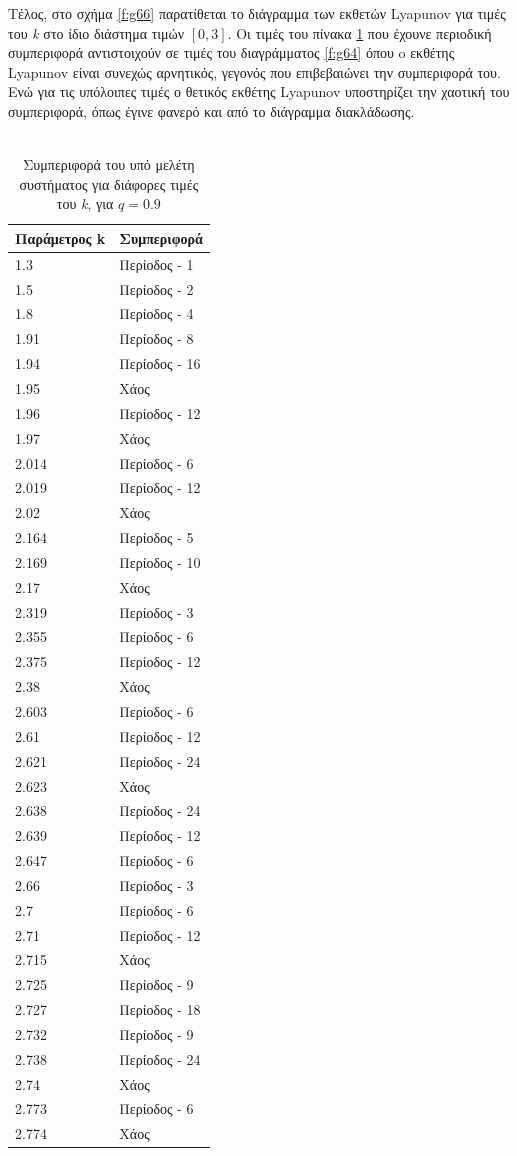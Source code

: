 Τέλος, στο σχήμα \ref{f:g66} παρατίθεται το διάγραμμα των εκθετών Lyapunov για τιμές του \emph{k} στο ίδιο διάστημα τιμών $[0, 3]$. Οι τιμές του πίνακα \ref{tab:abc13} που έχουνε περιοδική συμπεριφορά αντιστοιχούν σε τιμές του διαγράμματος \ref{f:g64} όπου o εκθέτης Lyapunov είναι συνεχώς αρνητικός, γεγονός που επιβεβαιώνει την συμπεριφορά του. Ενώ για τις υπόλοιπες τιμές ο θετικός εκθέτης Lyapunov υποστηρίζει την χαοτική του συμπεριφορά, όπως έγινε φανερό και από το διάγραμμα διακλάδωσης.\\\\

\begin{table}[ht]
	\centering
	\caption{ Συμπεριφορά του υπό μελέτη συστήματος για διάφορες τιμές του \emph{k}, για $q=0.9$ }
	\label{tab:abc13}
	\begin{tabular}{l | l}
		Παράμετρος k & Συμπεριφορά \\
		\hline
		1.3 &  Περίοδος -  1 \\
		1.5 &  Περίοδος -  2 \\
		1.8& Περίοδος -  4 \\
		1.91& Περίοδος -  8 \\
		1.94& Περίοδος -  16 \\
		1.95 & Xάος \\
		1.96& Περίοδος - 12 \\
		1.97& Xάος \\
		2.014& Περίοδος - 6 \\
		2.019& Περίοδος - 12\\
		2.02& Χάος \\
		2.164& Περίοδος - 5 \\
		2.169 &  Περίοδος - 10  \\
		2.17 &  Χάος \\
		2.319& Περίοδος - 3 \\
		2.355 &  Περίοδος - 6  \\
		2.375 &  Περίοδος -  12 \\
		2.38 &Χάος \\
		2.603 & Περίοδος - 6\\
		2.61& Περίοδος - 12\\
		2.621& Περίοδος - 24\\
		2.623& Xάος\\
		2.638 & Περίοδος - 24\\
		2.639& Περίοδος - 12\\
		2.647& Περίοδος - 6\\
		2.66 & Περίοδος - 3\\
		2.7 & Περίοδος -  6\\
		2.71 & Περίοδος -  12\\
		2.715 & Xάος\\
		2.725 & Περίοδος - 9\\
		2.727 & Περίοδος -  18\\
		2.732 & Περίοδος -  9\\
		2.738 & Περίοδος -  24\\
		2.74& Χάος\\
		2.773 & Περίοδος -  6\\
		2.774& Χάος\\
		

\end{tabular}
\end{table}
